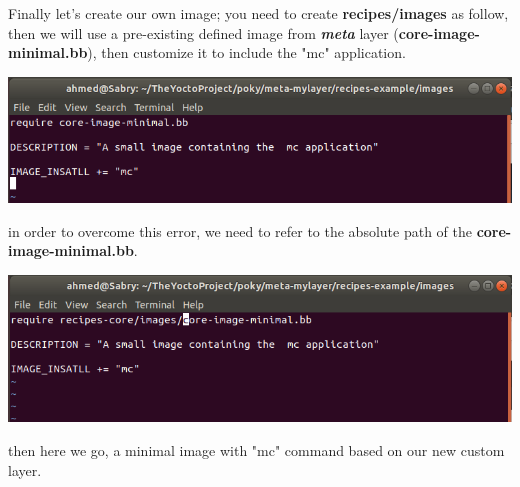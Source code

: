 \documentclass{article}
\begin{document}
Finally let's create our own image; you need to create \textbf{recipes/images} as follow, then we will use a pre-existing defined image from \textbf{\textit{meta}} layer (\textbf{core-image-minimal.bb}), then customize it to include the "mc" application. 

    
    
    \begin{center}
  \includegraphics[scale=0.60]{./resources/img/add-mc-to-install.png}
  \end{center}
  
    
    
    in order to overcome this error, we need to refer to the absolute path of the \textbf{core-image-minimal.bb}.
    \begin{center}
  \includegraphics[scale=0.60]{./resources/img/error-cantfindrecipe-core-minimal-solution.png}
  \end{center}
  
  then here we go, a minimal image with "mc" command based on our new custom layer.
  
\end{document}
